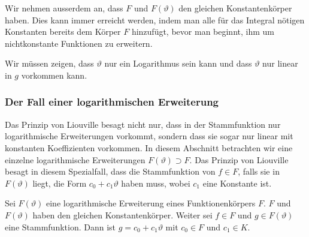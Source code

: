 Wir nehmen ausserdem an, dass $F$ und $F(\vartheta)$ den gleichen
Konstantenkörper haben.
Dies kann immer erreicht werden, indem man alle für das Integral
nötigen Konstanten bereits dem Körper $F$ hinzufügt, bevor man beginnt,
ihm um nichtkonstante Funktionen zu erweitern.

Wir müssen zeigen, dass $\vartheta$ nur ein Logarithmus sein kann und dass
$\vartheta$ nur linear in $g$ vorkommen kann.

%
%
\subsubsection{Der Fall einer logarithmischen Erweiterung}
Das Prinzip von Liouville besagt nicht nur, dass in der Stammfunktion nur
logarithmische Erweiterungen vorkommt, sondern dass sie sogar nur
linear mit konstanten Koeffizienten vorkommen.
In diesem Abschnitt betrachten wir eine einzelne logarithmische
Erweiterungen $F(\vartheta)\supset F$.
Das Prinzip von Liouville besagt in diesem Spezialfall, dass die
Stammfunktion von $f\in F$, falls sie in $F(\vartheta)$ liegt,
die Form $c_0+c_1\vartheta$ haben muss, wobei $c_1$ eine Konstante ist.

\begin{satz}
\label{buch:intalg:liouville:satz:logsimple}
Sei $F(\vartheta)$ eine logarithmische Erweiterung eines Funktionenkörpers
$F$.
$F$ und $F(\vartheta)$ haben den gleichen Konstantenkörper.
Weiter sei $f\in F$ und $g \in F(\vartheta)$ eine Stammfunktion.
Dann ist $g=c_0+c_1\vartheta$ mit $c_0\in F$ und $c_1\in K$.
\end{satz}

